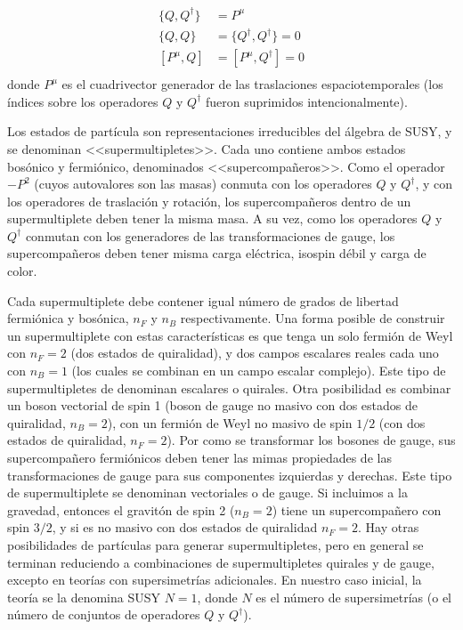 \begin{equation}
	\begin{split}	
		\{Q,Q^{\dagger}\} & = P^{\mu}\\
		\{Q,Q\} & = \{Q^{\dagger},Q^{\dagger}\} = 0\\
		[P^{\mu},Q] & = [P^{\mu},Q^{\dagger}] = 0\\
	\end{split}	
\end{equation}
%
donde $P^{\mu}$ es el cuadrivector generador de las traslaciones espaciotemporales (los índices sobre los operadores $Q$ y $Q^{\dagger}$ fueron suprimidos intencionalmente).


Los estados de partícula son representaciones irreducibles del álgebra de SUSY, y se denominan <<supermultipletes>>. Cada uno contiene ambos estados bosónico y fermiónico, denominados <<supercompañeros>>. Como el operador $-P^2$ (cuyos autovalores son las masas) conmuta con los operadores $Q$ y $Q^{\dagger}$, y con los operadores de traslación y rotación, los supercompañeros dentro de un supermultiplete deben tener la misma masa. A su vez, como los operadores $Q$ y $Q^{\dagger}$ conmutan con los generadores de las transformaciones de gauge, los supercompañeros deben tener misma carga eléctrica, isospin débil y carga de color.

Cada supermultiplete debe contener igual número de grados de libertad fermiónica y bosónica, $n_F$ y $n_B$ respectivamente. Una forma posible de construir un supermultiplete con estas características es que tenga un solo fermión de Weyl con $n_F=2$ (dos estados de quiralidad),
y dos campos escalares reales cada uno con $n_B=1$ (los cuales se combinan en un campo escalar complejo). Este tipo de supermultipletes de denominan escalares o quirales. Otra posibilidad es combinar un boson vectorial de spin 1 (boson de gauge no masivo con dos estados de quiralidad, $n_B=2$), con un fermión de Weyl no masivo de spin $1/2$ (con dos estados de quiralidad, $n_F=2$). Por como se transformar los bosones de gauge, sus supercompañero fermiónicos deben tener las mimas propiedades de las transformaciones de gauge para sus componentes izquierdas y derechas. Este tipo de supermultiplete se denominan vectoriales o de gauge. 
Si incluimos a la gravedad, entonces el gravitón de spin 2 ($n_B=2$) tiene un supercompañero con spin $3/2$, y si es no masivo con dos estados de quiralidad $n_F=2$. 
Hay otras posibilidades de partículas para generar supermultipletes, pero en general se terminan reduciendo a combinaciones de supermultipletes quirales y de gauge, excepto en teorías con supersimetrías adicionales. En nuestro caso inicial, la teoría se la denomina SUSY $N=1$, donde $N$ es el número de supersimetrías (o el número de conjuntos de operadores $Q$ y $Q^{\dagger}$). 

